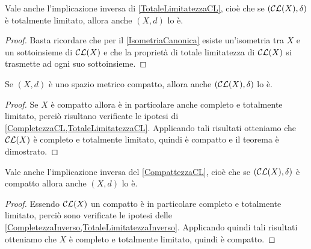 \begin{remark}\label{TotaleLimitatezzaInverso}
	Vale anche l'implicazione inversa di \cref{TotaleLimitatezzaCL}, cioè che se  $(\mathcal{CL}(X),\delta)$ è totalmente limitato, allora anche $(X,d)$ lo è.
\end{remark}
\begin{proof}
	Basta ricordare che per il \cref{IsometriaCanonica} esiste un'isometria tra $X$ e un sottoinsieme di $\mathcal{CL}(X)$ e che la proprietà di totale limitatezza di $\mathcal{CL}(X)$ si trasmette ad ogni suo sottoinsieme.
\end{proof}



\begin{theorem} \label{CompattezzaCL}
	Se $(X,d)$ è uno spazio metrico compatto, allora anche $(\mathcal{CL}(X),\delta)$ lo è.
\end{theorem}
\begin{proof}
	Se $X$ è compatto allora è in particolare anche completo e totalmente limitato, perciò risultano verificate le ipotesi di \cref{CompletezzaCL,TotaleLimitatezzaCL}. Applicando tali risultati otteniamo che $\mathcal{CL}(X)$ è completo e totalmente limitato, quindi è compatto e il teorema è dimostrato.
\end{proof}

\begin{remark} \label{CompattezzaInverso}
	Vale anche l'implicazione inversa del \cref{CompattezzaCL}, cioè che se  $(\mathcal{CL}(X),\delta)$ è compatto allora anche $(X,d)$ lo è.
\end{remark}
\begin{proof}
	Essendo $\mathcal{CL}(X)$ un compatto è in particolare completo e totalmente limitato, perciò sono verificate le ipotesi delle \cref{CompletezzaInverso,TotaleLimitatezzaInverso}. Applicando quindi tali risultati otteniamo che $X$ è completo e totalmente limitato, quindi è compatto.
\end{proof}

